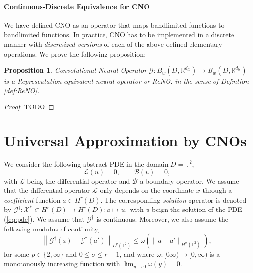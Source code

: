 \documentclass[reqno,10pt]{amsart}
\theoremstyle{plain}
\newtheorem{prop}{Proposition}
\theoremstyle{definition}
\newcommand{\bb}[1]{\mathbb{#1}}
\newcommand{\cal}[1]{\mathcal{#1}}
\begin{document}
    \paragraph{\bf Continuous-Discrete Equivalence for CNO} We have defined CNO as an operator that maps bandlimited functions to bandlimited functions. In practice, CNO has to be implemented in a discrete manner with {\it discretized versions} of each of the above-defined elementary operations. We prove the following proposition:
    \begin{prop}
        Convolutional Neural Operator $\cal G: B_w(D,\bb R^{d_{\cal X}}) \to B_w(D,\bb R^{d_{\cal Y}})$ is a Representation equivalent neural operator or ReNO, in the sense of Defintion \ref{def:ReNO}.      
    \end{prop}
    \begin{proof}
        TODO
    \end{proof}

    \section{Universal Approximation by CNOs}
    \noindent We consider the following abstract PDE in the domain $D = \bb T^2$,
    \begin{equation}\label{eq:pde}
        \cal L(u) = 0, \qquad \cal B(u) = 0,
    \end{equation}
    with $\cal L$ being the differential operator and $\cal B$ a boundary operator. We assume that the differential operator $\cal L$ only depends on the coordinate $x$ through a {\it coefficient} function $a \in H^r(D).$ The corresponding {\it solution} operator is denoted by $\cal G^\dag : \cal X^* \subset H^r(D) \to H^r(D) : a \mapsto u,$ with $u$ beign the solution of the PDE (\ref{eq:pde}). We assume that $\cal G^\dag$ is continuous. Moreover, we also assume the following modulus of continuity,
    \begin{equation}
        \left\|\cal G^\dag(a) - \cal G^\dag(a')\right\|_{L^p(\bb T^2)} \leq \omega\left(\|a - a'\|_{H^\sigma(\bb T^2)}\right),
    \end{equation}
    for some $p \in \{2,\infty\}$ and $0 \leq \sigma \leq r-1$, and where $\omega : [0\infty) \to [0,\infty)$ is a monotonously increasing function with $\lim_{y \to 0} \omega (y) = 0$.
\end{document}
